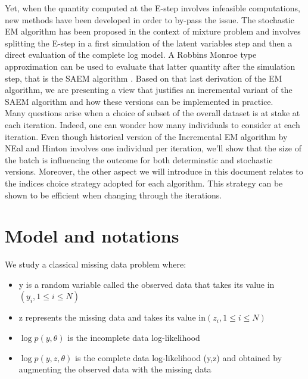 \documentclass[a4paper]{article}
\theoremstyle{plain}
\theoremstyle{plain}
\theoremstyle{definition}
\begin{document}
Yet, when the quantity computed at the E-step involves infeasible computations, new methods have been developed in order to by-pass the issue. The stochastic EM algorithm \citep{diebolt} has been proposed in the context of mixture problem and involves splitting the E-step in a first simulation of the latent variables step and then a direct evaluation of the complete log model. A Robbins Monroe type approximation can be used to evaluate that latter quantity after the simulation step, that is the SAEM algorithm \citep{lavielle2,moulines}.
Based on that last derivation of the EM algorithm, we are presenting a view that justifies an incremental variant of the SAEM algorithm and how these versions can be implemented in practice.\\
Many questions arise when a choice of subset of the overall dataset is at stake at each iteration. Indeed, one can wonder how many individuals to consider at each iteration. Even though historical version of the Incremental EM algorithm by NEal and Hinton involves one individual per iteration, we'll show that the size of the batch is influencing the outcome for both determinstic and stochastic versions. Moreover, the other aspect we will introduce in this document relates to the indices choice strategy adopted for each algorithm. This strategy can be shown to be efficient when changing through the iterations.





\section{Model and notations}
We study a classical missing data problem where:
\begin{itemize}
\item y is a random variable called the observed data that takes its value in $(y_i, 1\leq i \leq N)$
\item z represents the missing data and takes its value in$(z_i, 1\leq i \leq N)$
\item $\log p(y,\theta)$ is the incomplete data log-likelihood
\item $\log p(y,z,\theta)$ is the complete data log-likelihood (y,z) and obtained by augmenting the observed data with the missing data
\end{itemize}
\end{document}
